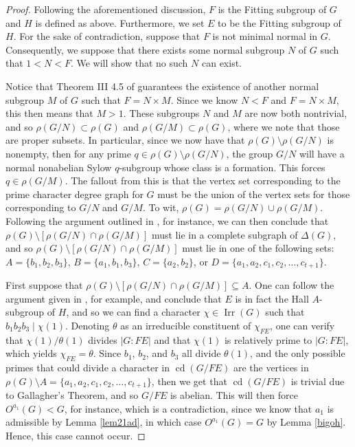 \documentclass[10pt,a4paper]{amsart}
\DeclareMathOperator{\Irr}{Irr}
\DeclareMathOperator{\cd}{cd}
\begin{document}
\begin{proof}
Following the aforementioned discussion, $F$ is the Fitting subgroup of $G$ and $H$ is defined as above. Furthermore, we set $E$ to be the Fitting subgroup of $H$. For the sake of contradiction, suppose that $F$ is not minimal normal in $G$. Consequently, we suppose that there exists some normal subgroup $N$ of $G$ such that $1<N<F$. We will show that no such $N$ can exist.

Notice that Theorem III 4.5 of \cite{H} guarantees the existence of another normal subgroup $M$ of $G$ such that $F=N\times M$. Since we know $N<F$ and $F=N\times M$, this then means that $M>1$. These subgroups $N$ and $M$ are now both nontrivial, and so $\rho(G/N)\subset\rho(G)$ and $\rho(G/M)\subset\rho(G)$, where we note that those are proper subsets. In particular, since we now have that $\rho(G)\setminus\rho(G/N)$ is nonempty, then for any prime $q\in\rho(G)\setminus\rho(G/N)$, the group $G/N$ will have a normal nonabelian Sylow $q$-subgroup whose class is a formation. This forces $q\in\rho(G/M)$. The fallout from this is that the vertex set corresponding to the prime character degree graph for $G$ must be the union of the vertex sets for those corresponding to $G/N$ and $G/M$. To wit, $\rho(G)=\rho(G/N)\cup\rho(G/M)$. Following the argument outlined in \cite{LMS}, for instance, we can then conclude that $\rho(G)\setminus[\rho(G/N)\cap\rho(G/M)]$ must lie in a complete subgraph of $\Delta(G)$, and so $\rho(G)\setminus[\rho(G/N)\cap\rho(G/M)]$ must lie in one of the following sets: $A=\{b_1,b_2,b_3\}$, $B=\{a_1,b_1,b_3\}$, $C=\{a_2,b_2\}$, or $D=\{a_1,a_2,c_1,c_2,\ldots,c_{t+1}\}$.

First suppose that $\rho(G)\setminus[\rho(G/N)\cap\rho(G/M)]\subseteq A$. One can follow the argument given in \cite{L3}, for example, and conclude that $E$ is in fact the Hall $A$-subgroup of $H$, and so we can find a character $\chi\in\Irr(G)$ such that $b_1b_2b_3\mid\chi(1)$. Denoting $\theta$ as an irreducible constituent of $\chi_{FE}$, one can verify that $\chi(1)/\theta(1)$ divides $|G:FE|$ and that $\chi(1)$ is relatively prime to $|G:FE|$, which yields $\chi_{FE}=\theta$. Since $b_1$, $b_2$, and $b_3$ all divide $\theta(1)$, and the only possible primes that could divide a character in $\cd(G/FE)$ are the vertices in $\rho(G)\setminus A=\{a_1,a_2,c_1,c_2,\ldots,c_{t+1}\}$, then we get that $\cd(G/FE)$ is trivial due to Gallagher's Theorem, and so $G/FE$ is abelian. This will then force $O^{a_1}(G)<G$, for instance, which is a contradiction, since we know that $a_1$ is admissible by Lemma \ref{lem21ad}, in which case $O^{a_1}(G)=G$ by Lemma \ref{bigoh}. Hence, this case cannot occur.


\end{proof}
\end{document}
